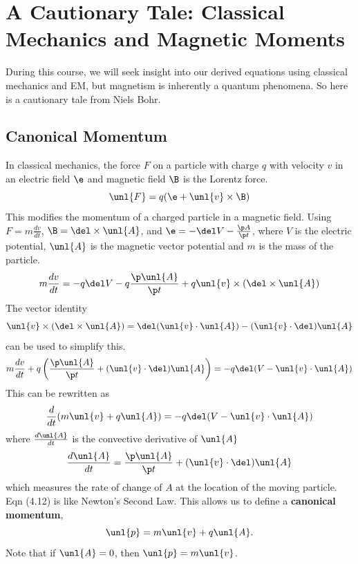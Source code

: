 \documentclass[a4paper, 11pt, normalem]{report}
\begin{document}
\section{A Cautionary Tale: Classical Mechanics and Magnetic Moments}
During this course, we will seek insight into our derived equations using classical mechanics and EM, but magnetism is inherently a quantum phenomena. 
So here is a cautionary tale from Niels Bohr. 

\subsection{Canonical Momentum}
In classical mechanics, the force $F$ on a particle with charge $q$ with velocity $v$ in an electric field $\e$ and magnetic field $\B$ is the Lorentz force. 
\begin{equation}
    \unl{F} = q(\e + \unl{v}\times\B)
\end{equation}
This modifies the momentum of a charged particle in a magnetic field.
Using $F = m\frac{dv}{dt}$, $\B = \del\times\unl{A}$, and $\e = -\del V - \frac{\p A}{\p t}$, where $V$ is the electric potential, $\unl{A}$ is the magnetic vector potential and $m$ is the mass of the particle. 
\begin{equation}
    m\frac{dv}{dt} = -q\del V - q\frac{\p \unl{A}}{\p t} + q\unl{v} \times (\del\times\unl{A})
\end{equation}
The vector identity
\begin{equation}
    \unl{v}\times(\del\times\unl{A}) = \del(\unl{v}\cdot\unl{A}) - (\unl{v}\cdot\del)\unl{A}
\end{equation}
can be used to simplify this. 
\begin{equation}
    m\frac{dv}{dt} + q\left(\frac{\p\unl{A}}{\p t} + (\unl{v}\cdot\del)\unl{A}\right) = -q\del(V - \unl{v}\cdot\unl{A})
\end{equation}
This can be rewritten as
\begin{equation}
    \frac{d}{dt}(m\unl{v} + q\unl{A}) = -q\del(V - \unl{v}\cdot\unl{A})
\end{equation}
where $\frac{d\unl{A}}{dt}$ is the convective derivative of $\unl{A}$
\begin{equation}
    \frac{d\unl{A}}{dt} = \frac{\p \unl{A}}{\p t} + (\unl{v}\cdot\del)\unl{A}
\end{equation}
which measures the rate of change of $A$ at the location of the moving particle. 
Eqn (4.12) is like Newton's Second Law. 
This allows us to define a \textbf{canonical momentum},
\begin{equation}
    \unl{p} = m\unl{v} + q\unl{A}.
\end{equation}
Note that  if $\unl{A} = 0$, then $\unl{p} = m\unl{v}$.
\end{document}
